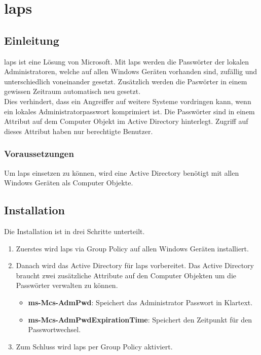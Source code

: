\chapter{\acrfull{laps}}
\section{Einleitung}
\acrfull{laps} ist eine Lösung von Microsoft.
Mit \acrshort{laps} werden die Passwörter der lokalen Administratoren, welche auf allen Windows Geräten vorhanden sind, zufällig und unterschiedlich voneinander gesetzt.
Zusätzlich werden die Paswörter in einem gewissen Zeitraum automatisch neu gesetzt.\\

Dies verhindert, dass ein Angreiffer auf weitere Systeme vordringen kann, wenn ein lokales Administratorpasswort komprimiert ist.
Die Passwörter sind in einem Attribut auf dem Computer Objekt im Active Directory hinterlegt.
Zugriff auf dieses Attribut haben nur berechtigte Benutzer.

\subsection{Voraussetzungen}
Um \acrshort{laps} einsetzen zu können, wird eine Active Directory benötigt mit allen Windows Geräten als Computer Objekte.

\section{Installation}
Die Installation ist in drei Schritte unterteilt.
\begin{enumerate}
    \item Zuerstes wird \acrshort{laps} via Group Policy auf allen Windows Geräten installiert.
    \item Danach wird das Active Directory für \acrshort{laps} vorbereitet. Das Active Directory braucht zwei zusätzliche Attribute auf den Computer Objekten um die Passwörter verwalten zu können.
          \begin{itemize}
              \item \textbf{ms-Mcs-AdmPwd}: Speichert das Administrator Passwort in Klartext.
              \item \textbf{ms-Mcs-AdmPwdExpirationTime}: Speichert den Zeitpunkt für den Passwortwechsel.
          \end{itemize}
    \item Zum Schluss wird \acrshort{laps} per Group Policy aktiviert.
\end{enumerate}

